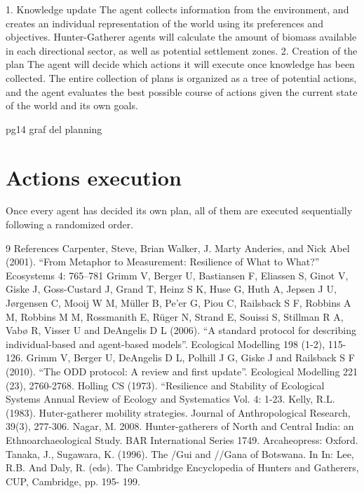 1. Knowledge update
The agent collects information from the environment, and creates an individual representation of the
world using its preferences and objectives. Hunter-Gatherer agents will calculate the amount of
biomass available in each directional sector, as well as potential settlement zones.
2. Creation of the plan
The agent will decide which actions it will execute once knowledge has been collected. The entire
collection of plans is organized as a tree of potential actions, and the agent evaluates the best
possible course of actions given the current state of the world and its own goals.

pg14 graf del planning

\section{Actions execution}

Once every agent has decided its own plan, all of them are executed sequentially following a
randomized order.



9 References
Carpenter, Steve, Brian Walker, J. Marty Anderies, and Nick Abel (2001). “From Metaphor to
Measurement: Resilience of What to What?” Ecosystems 4: 765–781
Grimm V, Berger U, Bastiansen F, Eliassen S, Ginot V, Giske J, Goss-Custard J, Grand T,
Heinz S K, Huse G, Huth A, Jepsen J U, Jørgensen C, Mooij W M, Müller B, Pe’er G, Piou C,
Railsback S F, Robbins A M, Robbins M M, Rossmanith E, Rüger N, Strand E, Souissi S,
Stillman R A, Vabø R, Visser U and DeAngelis D L (2006). “A standard protocol for describing
individual-based and agent-based models”. Ecological Modelling 198 (1-2), 115-126.
Grimm V, Berger U, DeAngelis D L, Polhill J G, Giske J and Railsback S F (2010). “The ODD
protocol: A review and first update”. Ecological Modelling 221 (23), 2760-2768.
Holling CS (1973). “Resilience and Stability of Ecological Systems Annual Review of Ecology
and Systematics Vol. 4: 1-23.
Kelly, R.L. (1983). Huter-gatherer mobility strategies. Journal of Anthropological Research,
39(3), 277-306.
Nagar, M. 2008. Hunter-gatherers of North and Central India: an Ethnoarchaeological Study.
BAR International Series 1749. Arcaheopress: Oxford.
Tanaka, J., Sugawara, K. (1996). The /Gui and //Gana of Botswana. In In: Lee, R.B. And Daly,
R. (eds). The Cambridge Encyclopedia of Hunters and Gatherers, CUP, Cambridge, pp. 195-
199.
